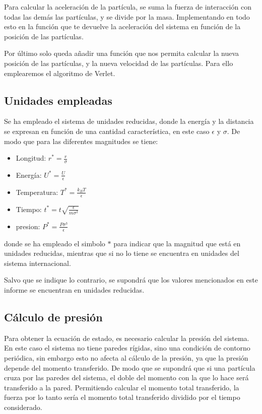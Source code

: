 \documentclass[11pt, twoside]{article} %
\begin{document}
Para calcular la aceleración de la partícula, se suma la fuerza de interacción con
todas las demás las partículas, y se divide por la masa. Implementando en todo esto en la función que te devuelve la aceleración del sistema
en función de la posición de las partículas.

Por último solo queda añadir una función que nos permita calcular la nueva posición
de las partículas, y la nueva velocidad de las partículas. Para ello emplearemos el
algoritmo de Verlet. 

\subsection{Unidades empleadas}

Se ha empleado el sistema de unidades reducidas, donde la energía y la distancia se 
expresan en función de una cantidad característica, en este caso $\epsilon$ y $\sigma$. 
De modo que para las diferentes magnitudes se tiene:
\begin{itemize}
    \item Longitud: $r^* = \frac{r}{\sigma}$
    \item Energía: $U^* = \frac{U}{\epsilon}$
    \item Temperatura: $T^* = \frac{k_B T}{\epsilon}$
    \item Tiempo: $t^* = t \sqrt{\frac{\epsilon}{m\sigma^2}}$
    \item presion: $P^* = \frac{P\sigma^3}{\epsilon}$
\end{itemize}
donde se ha empleado el simbolo $*$ para indicar que la magnitud que está en unidades 
reducidas, mientras que si no lo tiene se encuentra en unidades del sistema 
internacional. 

Salvo que se indique lo contrario, se supondrá que los valores mencionados en este
informe se encuentran en unidades reducidas.

\subsection{Cálculo de presión}

Para obtener la ecuación de estado, es necesario calcular la presión del sistema. 
En este caso el sistema no tiene paredes rígidas, sino una condición de contorno 
periódica, sin embargo esto no afecta al cálculo de la presión, ya que la presión 
depende del momento transferido. De modo que se supondrá que si una partícula cruza
por las paredes del sistema, el doble del momento con la que lo hace será transferido 
a la pared. Permitiendo calcular el momento total transferido, la fuerza por lo tanto
sería el momento total transferido dividido por el tiempo considerado. 
\end{document}

